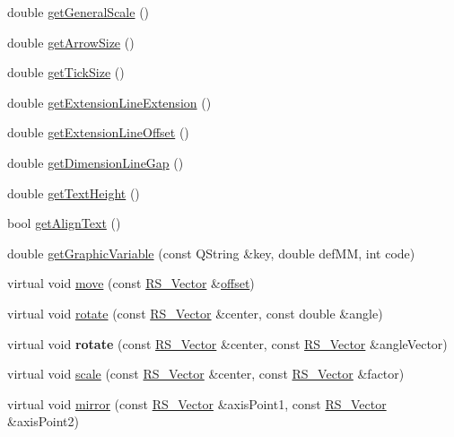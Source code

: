\begin{DoxyCompactItemize}
\item 
double \hyperlink{classRS__Dimension_a7edf98ac0f00ec331f662031ff658452}{get\-General\-Scale} ()
\item 
double \hyperlink{classRS__Dimension_a5953f67dd9a4914af4ad628c421f02ad}{get\-Arrow\-Size} ()
\item 
double \hyperlink{classRS__Dimension_acc0381aa6cce7d962bf4d612812ae2f3}{get\-Tick\-Size} ()
\item 
double \hyperlink{classRS__Dimension_a5789bceecd2ee323e12730785f6385d9}{get\-Extension\-Line\-Extension} ()
\item 
double \hyperlink{classRS__Dimension_ad25090ee076f98c22e664f6587b42389}{get\-Extension\-Line\-Offset} ()
\item 
double \hyperlink{classRS__Dimension_a3701a787cfb310f257bb6d7966abe69e}{get\-Dimension\-Line\-Gap} ()
\item 
double \hyperlink{classRS__Dimension_a8bb8b3bdfc7978afccc67ea308245596}{get\-Text\-Height} ()
\item 
bool \hyperlink{classRS__Dimension_a7dd4698c8caca37c3f083bcb97373aec}{get\-Align\-Text} ()
\item 
double \hyperlink{classRS__Dimension_a8f8db93a1c6c7d552739ef4d3f041065}{get\-Graphic\-Variable} (const Q\-String \&key, double def\-M\-M, int code)
\item 
virtual void \hyperlink{classRS__Dimension_a8c017d0a5bc14a6b517e700008ebe251}{move} (const \hyperlink{classRS__Vector}{R\-S\-\_\-\-Vector} \&\hyperlink{classRS__Entity_aa296d21b9aac99161d386ce2f60f0fea}{offset})
\item 
virtual void \hyperlink{classRS__Dimension_a7a67186938dd2375940510e1c1ebaad7}{rotate} (const \hyperlink{classRS__Vector}{R\-S\-\_\-\-Vector} \&center, const double \&angle)
\item 
\hypertarget{classRS__Dimension_ad4978e3c2dd497926b3a7f959190bc26}{virtual void {\bfseries rotate} (const \hyperlink{classRS__Vector}{R\-S\-\_\-\-Vector} \&center, const \hyperlink{classRS__Vector}{R\-S\-\_\-\-Vector} \&angle\-Vector)}\label{classRS__Dimension_ad4978e3c2dd497926b3a7f959190bc26}

\item 
virtual void \hyperlink{classRS__Dimension_ae8af3c073d64e0bffa5d1730efd83ccc}{scale} (const \hyperlink{classRS__Vector}{R\-S\-\_\-\-Vector} \&center, const \hyperlink{classRS__Vector}{R\-S\-\_\-\-Vector} \&factor)
\item 
virtual void \hyperlink{classRS__Dimension_a24da8a93a35ef2e7bd69738b8d3a815e}{mirror} (const \hyperlink{classRS__Vector}{R\-S\-\_\-\-Vector} \&axis\-Point1, const \hyperlink{classRS__Vector}{R\-S\-\_\-\-Vector} \&axis\-Point2)
\end{DoxyCompactItemize}
